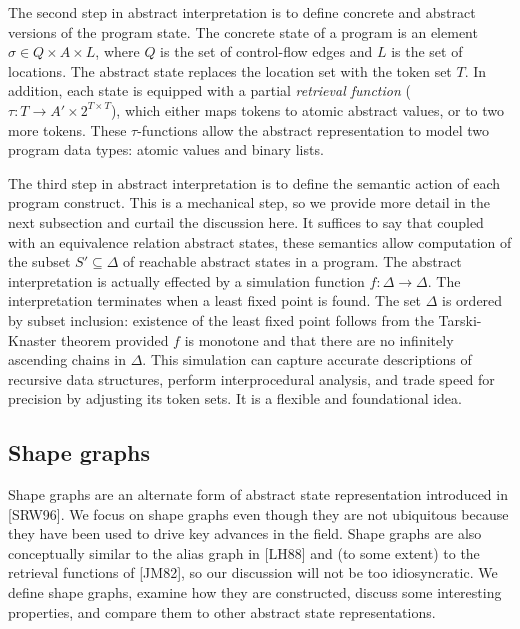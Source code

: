 \documentclass{article}
\begin{document}
The second step in abstract interpretation is to define concrete and
abstract versions of the program state.  The concrete state of a program is
an element $\sigma \in Q \times A \times L$, where $Q$ is the set of
control-flow edges and $L$ is the set of locations. The abstract state
replaces the location set with the token set $T$. In addition, each state is
equipped with a partial \textit{retrieval function} ($\tau : T \rightarrow
A' \times 2^{T \times T}$), which either maps tokens to atomic abstract
values, or to two more tokens. These $\tau$-functions allow the abstract
representation to model two program data types: atomic values and binary
lists.

The third step in abstract interpretation is to define the semantic action
of each program construct. This is a mechanical step, so we provide more
detail in the next subsection and curtail the discussion here. It suffices
to say that coupled with an equivalence relation abstract states, these
semantics allow computation of the subset $S' \subseteq \Delta$ of reachable
abstract states in a program. The abstract interpretation is actually
effected by a simulation function $f : \Delta \rightarrow \Delta$. The
interpretation terminates when a least fixed point is found. The set
$\Delta$ is ordered by subset inclusion: existence of the least fixed point
follows from the Tarski-Knaster theorem provided $f$ is monotone and that
there are no infinitely ascending chains in $\Delta$. This simulation can
capture accurate descriptions of recursive data structures, perform
interprocedural analysis, and trade speed for precision by adjusting its
token sets. It is a flexible and foundational idea.

\subsection{Shape graphs}

Shape graphs are an alternate form of abstract state representation
introduced in [SRW96]. We focus on shape graphs even though they are not
ubiquitous because they have been used to drive key advances in the field.
Shape graphs are also conceptually similar to the alias graph in [LH88] and
(to some extent) to the retrieval functions of [JM82], so our discussion
will not be too idiosyncratic. We define shape graphs, examine how they are
constructed, discuss some interesting properties, and compare them to other
abstract state representations.
\end{document}
